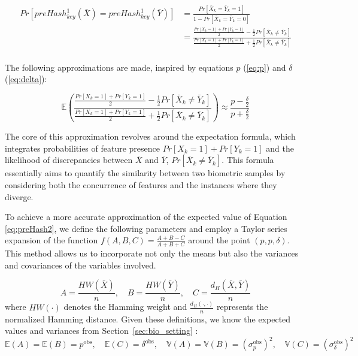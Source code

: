 \begin{equation} \label{eq:preHash2}
    \begin{aligned}
        Pr[preHash_{key}^1(\bar{X}) = preHash_{key}^1(\bar{Y})] &= \frac{Pr[\bar{X}_k = \bar{Y}_k = 1]}{1 - Pr[\bar{X}_k = \bar{Y}_k = 0]}\\
        &= \frac{\frac{Pr[X_k = 1] + Pr[Y_k = 1]}{2} - \frac{1}{2}Pr[\bar{X}_k \neq \bar{Y}_k]}{\frac{Pr[X_k = 1] + Pr[Y_k = 1]}{2} + \frac{1}{2}Pr[\bar{X}_k \neq \bar{Y}_k]}\\
    \end{aligned}
\end{equation}

The following approximations are made, inspired by equations \(p\) (\ref{eq:p}) and $\delta$ (\ref{eq:delta}):

\begin{equation}
    \mathbb{E}\left(\frac{\frac{Pr[X_k = 1] + Pr[Y_k = 1]}{2} - \frac{1}{2}Pr[\bar{X}_k \neq \bar{Y}_k]}{\frac{Pr[X_k = 1] + Pr[Y_k = 1]}{2} + \frac{1}{2}Pr[\bar{X}_k \neq \bar{Y}_k]}\right) \approx \frac{p - \frac{\delta}{2}}{p + \frac{\delta}{2}}
\end{equation}

The core of this approximation revolves around the expectation formula, which integrates probabilities of feature presence \(Pr[X_k=1]+Pr[Y_k=1]\) and the likelihood of discrepancies between \(\bar{X}\) and \(\bar{Y}\), \(Pr[\bar{X}_k \neq \bar{Y}_k]\). This formula essentially aims to quantify the similarity between two biometric samples by considering both the concurrence of features and the instances where they diverge.

To achieve a more accurate approximation of the expected value of Equation \ref{eq:preHash2}, we define the following parameters and employ a Taylor series expansion of the function \(f(A,B,C) = \frac{A + B - C}{A + B + C}\) around the point \((p, p, \delta)\). This method allows us to incorporate not only the means but also the variances and covariances of the variables involved.

\[
A = \frac{HW(\bar{X})}{n}, \quad B = \frac{HW(\bar{Y})}{n}, \quad C = \frac{d_H(\bar{X}, \bar{Y})}{n}
\]
where \(HW(\cdot)\) denotes the Hamming weight and \(\frac{d_H(\cdot, \cdot)}{n}\) represents the normalized Hamming distance. Given these definitions, we know the expected values and variances from Section~\ref{sec:bio_setting} :
\[
    \mathbb{E}(A) = \mathbb{E}(B) = p^\text{obs}, \quad \mathbb{E}(C) = \delta^\text{obs}, \quad \mathbb{V}(A) = \mathbb{V}(B) = ({\sigma^\text{obs}_p})^2, \quad \mathbb{V}(C) = ({\sigma^\text{obs}_\delta})^2
\]

